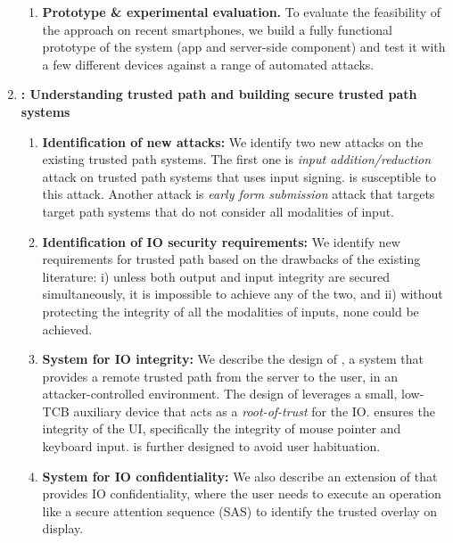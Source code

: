 \begin{enumerate}
\begin{enumerate}
	\item \textbf{Prototype \& experimental evaluation.}
	To evaluate the feasibility of the approach on recent smartphones, we build a fully functional prototype of the \integriscreen system (\integriscreen app and \integriscreen{} server-side component) and test it with a few different devices against a range of automated attacks.

	
\end{enumerate}


    \item \textbf{\protection: Understanding trusted path and building secure trusted path systems}
    \begin{enumerate}
      
      	\item \textbf{Identification of new attacks:} We identify two new attacks on the existing trusted path systems. The first one is \emph{input addition/reduction} attack on trusted path systems that uses input signing. \integrikey is susceptible to this attack. Another attack is \emph{early form submission} attack that targets target path systems that do not consider all modalities of input.
      	 
        \item  \textbf{Identification of IO security requirements:} We identify new requirements for trusted path based on the drawbacks of the existing literature: i) unless both output and input integrity are secured simultaneously, it is impossible to achieve any of the two, and ii) without protecting the integrity of all the modalities of inputs, none could be achieved.
        
        \item \textbf{System for IO integrity:} We describe the design of \protection, a system that provides a remote trusted path from the server to the user, in an attacker-controlled environment. The design of \protection leverages a small, low-TCB auxiliary device that acts as a \emph{root-of-trust} for the IO. \protection ensures the integrity of the UI, specifically the integrity of mouse pointer and keyboard input. \protection is further designed to avoid user habituation.
        
        \item \textbf{System for IO confidentiality:} We also describe an extension of \protection that provides IO confidentiality, where the user needs to execute an operation like a secure attention sequence (SAS) to identify the trusted overlay on display.
        

\end{enumerate}
\end{enumerate}
